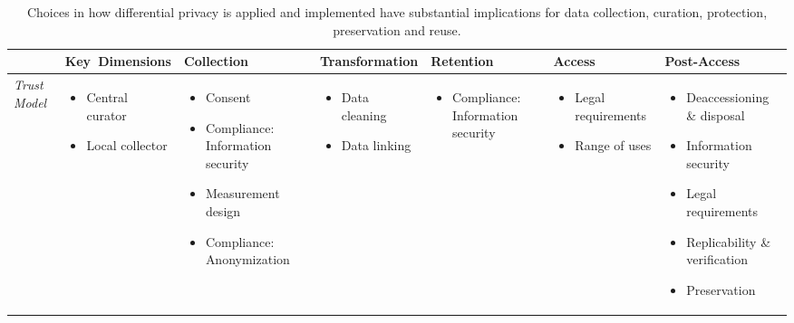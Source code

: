 

\begin{sidewaystable}[p]
\caption{\label{table:lifecycleimplications} Choices in how differential privacy is applied and implemented have substantial implications for data collection, curation, protection, preservation and reuse.}
\fontsize{7}{8}\selectfont
\begin{tabularx}{1\textwidth}{ p{0.55in} YYYYYY}
\hline

\toprule
& Key~Dimensions & Collection & Transformation & Retention & Access & Post-Access \\
\midrule

\textit{Trust Model} & \begin{itemize}[lifecyclesep] \item Central curator \item Local collector \end{itemize}& \begin{itemize}[lifecyclesep] \item Consent \item Compliance: Information security \item Measurement design\item Compliance: Anonymization \end{itemize} & \begin{itemize}[lifecyclesep] \item Data cleaning \item Data linking\end{itemize} & \begin{itemize}[lifecyclesep] \item Compliance: Information security \end{itemize} & \begin{itemize}[lifecyclesep] \item Legal requirements \item Range of uses\end{itemize} & \begin{itemize}[lifecyclesep] \item Deaccessioning \& disposal \item Information security \item Legal requirements \item Replicability \& verification \item Preservation\end{itemize}\\ 
\midrule


\end{tabularx}
\end{sidewaystable}
